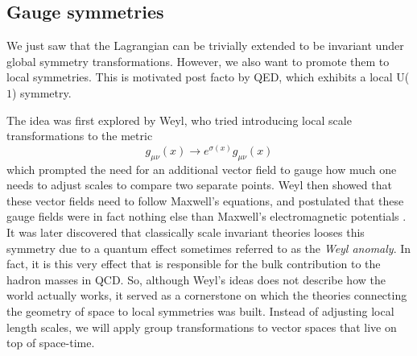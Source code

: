 \subsection{Gauge symmetries}

We just saw that the Lagrangian can be trivially extended to be invariant under
global symmetry transformations. However, we also want to promote them to local
symmetries. This is motivated post facto by QED, which exhibits a local U($1$)
symmetry.

The idea was first explored by Weyl, who tried introducing local scale
transformations to the metric
%
\begin{equation}
  g_{\mu\nu}(x) \to e^{\sigma(x)}g_{\mu\nu}(x)
\end{equation}
%
which prompted the need for an additional vector field to gauge how much one
needs to adjust scales to compare two separate points. Weyl then showed that
these vector fields need to follow Maxwell's equations, and postulated that
these gauge fields were in fact nothing else than Maxwell's electromagnetic
potentials \citep{Weyl:1918ib}. It was later discovered that classically scale
invariant theories looses this symmetry due to a quantum effect sometimes
referred to as the \emph{Weyl anomaly}. In fact, it is this very effect that is
responsible for the bulk contribution to the hadron masses in QCD. So, although
Weyl's ideas does not describe how the world actually works, it served as a
cornerstone on which the theories connecting the geometry of space to local
symmetries was built. Instead of adjusting local length scales, we will apply
group transformations to vector spaces that live on top of space-time.

